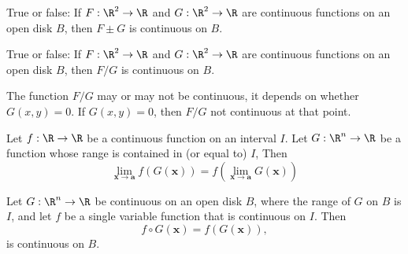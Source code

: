 \documentclass{ximera}
\newcommand{\pt}[1]{\mathbf{#1}} %
\begin{document}
\begin{question}
  True or false: If $F:\R^2\to\R$ and $G:\R^2\to\R$ are continuous
  functions on an open disk $B$, then $F\pm G$ is continuous on $B$.
  \begin{prompt}
    \begin{multipleChoice}
  \end{multipleChoice}
  \end{prompt}
\end{question}

\begin{question}
  True or false: If $F:\R^2\to\R$ and $G:\R^2\to\R$ are continuous
  functions on an open disk $B$, then $F/G$ is continuous on $B$.
  \begin{prompt}
    \begin{multipleChoice}
    \end{multipleChoice}
    \begin{feedback}
      The function $F/G$ may or may not be continuous, it depends on
      whether $G(x,y)=0$. If $G(x,y)=0$, then $F/G$ not continuous at that point.
    \end{feedback}
  \end{prompt}
\end{question}


\begin{theorem}
  Let $f:\R\to\R$ be a continuous function on an interval $I$. Let
  $G:\R^n\to \R$ be a function whose range is contained in (or equal
  to) $I$, Then
  \[
  \lim_{\pt{x}\to\pt{a}} f( G(\pt{x})) = f(\lim_{\pt{x}\to\pt{a}}G(\pt{x}))
  \]
\end{theorem}


\begin{corollary}
  Let $G:\R^n\to \R$ be continuous on an open disk $B$, where the
  range of $G$ on $B$ is $I$, and let $f$ be a single variable
  function that is continuous on $I$. Then
  \[
  f\circ G(\pt{x}) =f(G(\pt{x})),
  \]
  is continuous on $B$.
\end{corollary}
\end{document}

